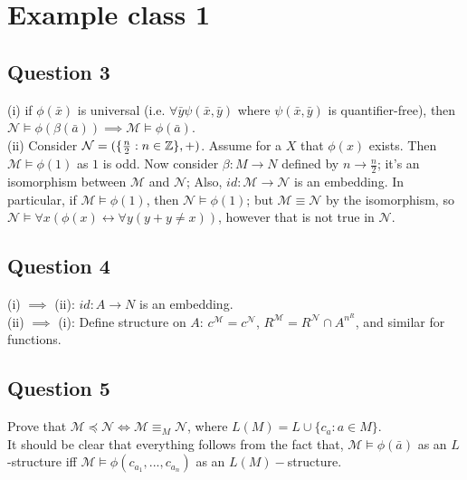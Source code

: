 \documentclass[a4paper]{article}
\begin{document}
\newpage

\section{Example class 1}

\subsection{Question 3}
(i) if $\phi(\bar{x})$ is universal (i.e. $\forall \bar{y} \psi(\bar{x},\bar{y})$ where $\psi(\bar{x},\bar{y})$ is quantifier-free), then $\mathcal{N} \vDash \phi(\beta(\bar{a})) \implies \mathcal{M} \vDash \phi(\bar{a})$.\\
(ii) Consider $\mathcal{N} = (\{\frac{n}{2} : n \in \mathbb{Z} \},+)$. Assume for a $X$ that $\phi(x)$ exists. Then $\mathcal{M} \vDash \phi(1)$ as $1$ is odd. Now consider $\beta:M \to N$ defined by $n \to \frac{n}{2}$; it's an isomorphism between $\mathcal{M}$ and $\mathcal{N}$; Also, $id:\mathcal{M} \to \mathcal{N}$ is an embedding. In particular, if $\mathcal{M} \vDash \phi(1)$, then $\mathcal{N} \vDash \phi(1)$; but $\mathcal{M} \equiv \mathcal{N}$ by the isomorphism, so $\mathcal{N} \vDash \forall x (\phi(x) \leftrightarrow \forall y (y +y \neq x))$, however that is not true in $\mathcal{N}$.

\subsection{Question 4}
(i) $\implies$ (ii): $id: A \to N$ is an embedding.\\
(ii) $\implies$ (i): Define structure on $A$: $c^{\mathcal{M}} = c^{\mathcal{N}}$, $R^{\mathcal{M}} = R^{\mathcal{N}} \cap A^{n^R}$, and similar for functions.

\subsection{Question 5}
Prove that $\mathcal{M} \preccurlyeq \mathcal{N} \iff \mathcal{M} \equiv_M \mathcal{N}$, where $L(M) = L \cup \{c_a: a \in M\}$.\\
It should be clear that everything follows from the fact that, $\mathcal{M} \vDash \phi(\bar{a})$ as an $L$-structure iff $\mathcal{M} \vDash \phi(c_{a_1},...,c_{a_n})$ as an $L(M)-$structure.
\end{document}
